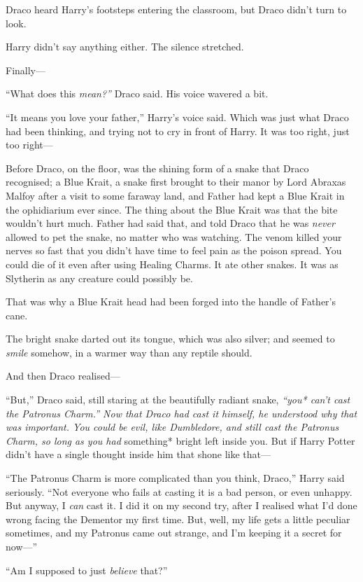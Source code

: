 Draco heard Harry's footsteps entering the classroom, but Draco didn't
turn to look.

Harry didn't say anything either. The silence stretched.

Finally---

``What does this \emph{mean?''} Draco said. His voice wavered a bit.

``It means you love your father,'' Harry's voice said. Which was just
what Draco had been thinking, and trying not to cry in front of Harry.
It was too right, just too right---

Before Draco, on the floor, was the shining form of a snake that Draco
recognised; a Blue Krait, a snake first brought to their manor by Lord
Abraxas Malfoy after a visit to some faraway land, and Father had kept a
Blue Krait in the ophidiarium ever since. The thing about the Blue Krait
was that the bite wouldn't hurt much. Father had said that, and told
Draco that he was \emph{never} allowed to pet the snake, no matter who
was watching. The venom killed your nerves so fast that you didn't have
time to feel pain as the poison spread. You could die of it even after
using Healing Charms. It ate other snakes. It was as Slytherin as any
creature could possibly be.

That was why a Blue Krait head had been forged into the handle of
Father's cane.

The bright snake darted out its tongue, which was also silver; and
seemed to \emph{smile} somehow, in a warmer way than any reptile should.

And then Draco realised---

``But,'' Draco said, still staring at the beautifully radiant snake,
\emph{``you* can't cast the Patronus Charm.'' Now that Draco had cast it
himself, he understood why that was important. You could be evil, like
Dumbledore, and still cast the Patronus Charm, so long as you had
}something* bright left inside you. But if Harry Potter didn't have a
single thought inside him that shone like that---

``The Patronus Charm is more complicated than you think, Draco,'' Harry
said seriously. ``Not everyone who fails at casting it is a bad person,
or even unhappy. But anyway, I \emph{can} cast it. I did it on my second
try, after I realised what I'd done wrong facing the Dementor my first
time. But, well, my life gets a little peculiar sometimes, and my
Patronus came out strange, and I'm keeping it a secret for now---''

``Am I supposed to just \emph{believe} that?''


